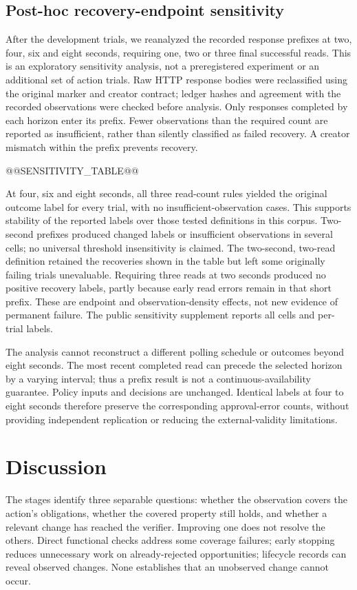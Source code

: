 \documentclass[manuscript,review,nonacm]{acmart}
\begin{document}
\subsection{Post-hoc recovery-endpoint sensitivity}
After the development trials, we reanalyzed the recorded response prefixes at two, four, six and eight seconds, requiring one, two or three final successful reads. This is an exploratory sensitivity analysis, not a preregistered experiment or an additional set of action trials. Raw HTTP response bodies were reclassified using the original marker and creator contract; ledger hashes and agreement with the recorded observations were checked before analysis. Only responses completed by each horizon enter its prefix. Fewer observations than the required count are reported as insufficient, rather than silently classified as failed recovery. A creator mismatch within the prefix prevents recovery.

@@SENSITIVITY_TABLE@@

At four, six and eight seconds, all three read-count rules yielded the original outcome label for every trial, with no insufficient-observation cases. This supports stability of the reported labels over those tested definitions in this corpus. Two-second prefixes produced changed labels or insufficient observations in several cells; no universal threshold insensitivity is claimed. The two-second, two-read definition retained the recoveries shown in the table but left some originally failing trials unevaluable. Requiring three reads at two seconds produced no positive recovery labels, partly because early read errors remain in that short prefix. These are endpoint and observation-density effects, not new evidence of permanent failure. The public sensitivity supplement reports all cells and per-trial labels.

The analysis cannot reconstruct a different polling schedule or outcomes beyond eight seconds. The most recent completed read can precede the selected horizon by a varying interval; thus a prefix result is not a continuous-availability guarantee. Policy inputs and decisions are unchanged. Identical labels at four to eight seconds therefore preserve the corresponding approval-error counts, without providing independent replication or reducing the external-validity limitations.

\section{Discussion}
The stages identify three separable questions: whether the observation covers the action's obligations, whether the covered property still holds, and whether a relevant change has reached the verifier. Improving one does not resolve the others. Direct functional checks address some coverage failures; early stopping reduces unnecessary work on already-rejected opportunities; lifecycle records can reveal observed changes. None establishes that an unobserved change cannot occur.
\end{document}
